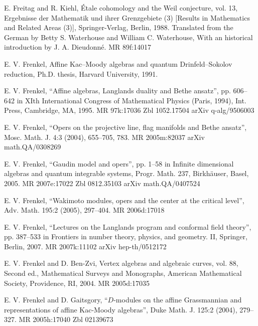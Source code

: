 \par{} E. Freitag and R. Kiehl, \'Etale cohomology and the Weil conjecture, vol. 13, Ergebnisse der Mathematik und ihrer Grenzgebiete (3) [Results in Mathematics and Related Areas (3)], Springer-Verlag, Berlin, 1988. Translated from the German by Betty S. Waterhouse and William C. Waterhouse, With an historical introduction by J. A. Dieudonn\'e. MR 89f:14017

\par\noindent [Frenkel 1991] E. V. Frenkel, Affine Kac--Moody algebras and quantum Drinfeld--Sokolov reduction, Ph.D. thesis, Harvard University, 1991.

\par\noindent [Frenkel 1995] E. V. Frenkel, ``Affine algebras, Langlands duality and Bethe ansatz'', pp. 606--642 in XIth International Congress of Mathematical Physics (Paris, 1994), Int. Press, Cambridge, MA, 1995. MR 97k:17036 Zbl 1052.17504 arXiv q-alg/9506003

\par\noindent [Frenkel 2004] E. V. Frenkel, ``Opers on the projective line, flag manifolds and Bethe ansatz'', Mosc. Math. J. 4:3 (2004), 655--705, 783. MR 2005m:82037 arXiv math.QA/0308269

\par\noindent [Frenkel 2005a] E. V. Frenkel, ``Gaudin model and opers'', pp. 1--58 in Infinite dimensional algebras and quantum integrable systems, Progr. Math. 237, Birkh\"auser, Basel, 2005. MR 2007e:17022 Zbl 0812.35103 arXiv math.QA/0407524

\par\noindent [Frenkel 2005b] E. V. Frenkel, ``Wakimoto modules, opers and the center at the critical level'', Adv. Math. 195:2 (2005), 297--404. MR 2006d:17018

\par\noindent [Frenkel 2007] E. V. Frenkel, ``Lectures on the Langlands program and conformal field theory'', pp. 387--533 in Frontiers in number theory, physics, and geometry. II, Springer, Berlin, 2007. MR 2007k:11102 arXiv hep-th/0512172

\par{} E. V. Frenkel and D. Ben-Zvi, Vertex algebras and algebraic curves, vol. 88, Second ed., Mathematical Surveys and Monographs, American Mathematical Society, Providence, RI, 2004. MR 2005d:17035

\par{} E. V. Frenkel and D. Gaitsgory, ``$D$-modules on the affine Grassmannian and representations of affine Kac-Moody algebras'', Duke Math. J. 125:2 (2004), 279--327. MR 2005h:17040 Zbl 02139673

